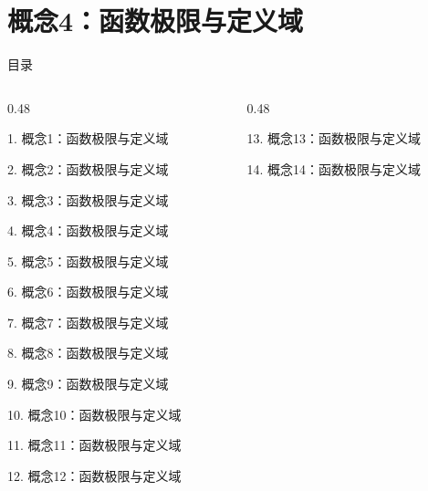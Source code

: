 \documentclass[aspectratio=169,10pt,fontset=fandol]{ctexbeamer}
\begin{document}
\section{概念4：函数极限与定义域}
\begin{frame}[t,fragile]{目录}
\small
\begin{columns}[T,onlytextwidth]
\begin{column}{0.48\textwidth}
{\color{black}\small 1. 概念1：函数极限与定义域\par}\vspace{0.22em}
{\color{black}\small 2. 概念2：函数极限与定义域\par}\vspace{0.22em}
{\color{black}\small 3. 概念3：函数极限与定义域\par}\vspace{0.22em}
{\color{blue}\small 4. 概念4：函数极限与定义域\par}\vspace{0.22em}
{\color{gray!40}\small 5. 概念5：函数极限与定义域\par}\vspace{0.22em}
{\color{gray!40}\small 6. 概念6：函数极限与定义域\par}\vspace{0.22em}
{\color{gray!40}\small 7. 概念7：函数极限与定义域\par}\vspace{0.22em}
{\color{gray!40}\small 8. 概念8：函数极限与定义域\par}\vspace{0.22em}
{\color{gray!40}\small 9. 概念9：函数极限与定义域\par}\vspace{0.22em}
{\color{gray!40}\small 10. 概念10：函数极限与定义域\par}\vspace{0.22em}
{\color{gray!40}\small 11. 概念11：函数极限与定义域\par}\vspace{0.22em}
{\color{gray!40}\small 12. 概念12：函数极限与定义域\par}\vspace{0.22em}
\end{column}
\begin{column}{0.48\textwidth}
{\color{gray!40}\small 13. 概念13：函数极限与定义域\par}\vspace{0.22em}
{\color{gray!40}\small 14. 概念14：函数极限与定义域\par}\vspace{0.22em}

\end{column}
\end{columns}
\end{frame}
\end{document}
